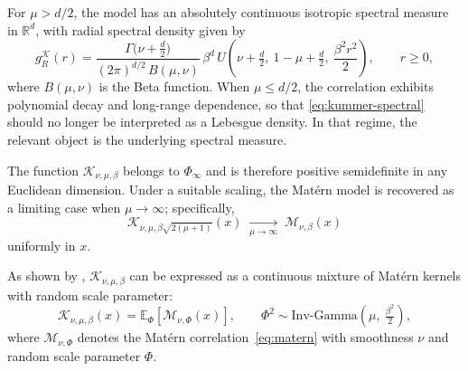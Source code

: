 \documentclass[
  12pt]{article}
\begin{document}
For $\mu > d/2$, the model has an absolutely continuous isotropic spectral measure in $\mathbb{R}^d$, with radial spectral density given by \citep{Bhadra2025}
\begin{equation}\label{eq:kummer-spectral}
g_{R}^{\mathcal{K}}(r)
=
\frac{\Gamma\!\bigl(\nu+\tfrac d2\bigr)}{(2\pi)^{d/2}\,B(\mu,\nu)}\,
\beta^{d}\,
U\!\left(\nu+\tfrac d2,\ 1-\mu+\tfrac d2,\ \frac{\beta^{2}r^{2}}{2}\right),
\qquad r \ge 0,
\end{equation}
where $B(\mu,\nu)$ is the Beta function.
When $\mu \le d/2$, the correlation exhibits polynomial decay and long-range dependence, so that \eqref{eq:kummer-spectral} should no longer be interpreted as a Lebesgue density.
In that regime, the relevant object is the underlying spectral measure.

The function $\mathcal{K}_{\nu,\mu,\beta}$ belongs to $\Phi_\infty$ and is therefore positive semidefinite in any Euclidean dimension.
Under a suitable scaling, the Mat\'ern model is recovered as a limiting case when $\mu \to \infty$; specifically,
\begin{equation}\label{kkmm}
\mathcal{K}_{\nu,\mu,\beta\sqrt{2(\mu+1)}}\!\left(x\right)
\;\xrightarrow[\mu \to \infty]{}\;
\mathcal{M}_{\nu,\beta}(x)
\end{equation}
uniformly in $x$.

As shown by \cite{ma2022beyond}, $\mathcal{K}_{\nu,\mu,\beta}$ can be expressed as a continuous mixture of Mat\'ern kernels with random scale parameter:
\begin{equation}\label{eq:kummer-mixture}
\mathcal{K}_{\nu,\mu,\beta}(x)
= \mathbb{E}_{\Phi}\!\left[\mathcal{M}_{\nu,\Phi}(x)\right],
\qquad
\Phi^{2} \sim \mathrm{Inv\text{-}Gamma}\!\left(\mu,\ \tfrac{\beta^{2}}{2}\right),
\end{equation}
where $\mathcal{M}_{\nu,\Phi}$ denotes the Mat\'ern correlation~\eqref{eq:matern} with smoothness $\nu$ and random scale parameter $\Phi$.
\end{document}
